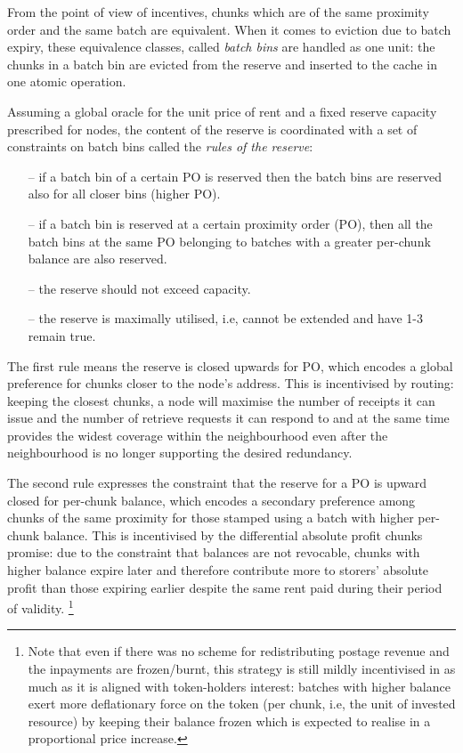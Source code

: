 From the point of view of incentives, chunks which are of the same proximity order and the same batch are equivalent. When it comes to eviction due to batch expiry, these equivalence classes, called \emph{batch bins} are handled as one unit: the chunks in a batch bin are evicted from the reserve and inserted to the cache in one atomic operation. 

Assuming a global oracle for the unit price of rent and a fixed reserve capacity  prescribed for nodes, the content of the reserve is coordinated with  a set of constraints on batch bins called the \emph{rules of the reserve}:
\begin{itemize}[noitemsep]
    \item[--] if a batch bin of a certain PO is reserved then the batch bins are reserved also for all closer bins (higher PO). 
    \item[--] if a batch bin is reserved at a certain proximity order (PO), then all the batch bins at the same PO belonging to batches with a greater per-chunk balance are also reserved. 
    \item[--] the reserve should not exceed capacity.
    \item[--] the reserve is maximally utilised, i.e, cannot be extended and have 1-3 remain true.
\end{itemize}

The first rule means the reserve is closed upwards for PO, which encodes a global preference for  chunks closer to the node's address. This is incentivised by routing: keeping the closest chunks, a node will maximise the number of receipts it can issue and the number of retrieve requests it can respond to and at the same time provides the widest coverage within the neighbourhood even after the neighbourhood is no longer supporting the desired redundancy.

The second rule expresses the constraint that the reserve for a PO is upward closed for per-chunk balance, which encodes a secondary preference among chunks of the same proximity for those stamped using a batch with higher per-chunk balance. This is incentivised by the differential absolute profit chunks promise: due to the  constraint that balances are not revocable, chunks with higher balance expire later and therefore contribute more to storers' absolute profit than those expiring earlier despite the same rent paid during their period of validity.%
%
\footnote{Note that even if there was no scheme for redistributing postage revenue and the inpayments are frozen/burnt, this strategy is still mildly incentivised in as much as it is aligned with token-holders interest: batches with higher balance exert more deflationary force on the token (per chunk, i.e, the unit of invested resource) by keeping their balance frozen which is expected to realise in a proportional price increase.}



